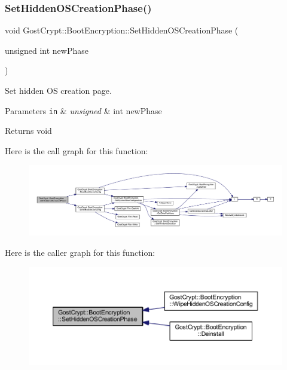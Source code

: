 \subsubsection{\texorpdfstring{Set\+Hidden\+O\+S\+Creation\+Phase()}{SetHiddenOSCreationPhase()}}
{\footnotesize\ttfamily void Gost\+Crypt\+::\+Boot\+Encryption\+::\+Set\+Hidden\+O\+S\+Creation\+Phase (\begin{DoxyParamCaption}\item[{unsigned int}]{new\+Phase }\end{DoxyParamCaption})}



Set hidden OS creation page. 


\begin{DoxyParams}[1]{Parameters}
\mbox{\tt in}  & {\em unsigned} & int new\+Phase \\
\hline
\end{DoxyParams}
\begin{DoxyReturn}{Returns}
void 
\end{DoxyReturn}
Here is the call graph for this function\+:
\nopagebreak
\begin{figure}[H]
\begin{center}
\leavevmode
\includegraphics[width=350pt]{class_gost_crypt_1_1_boot_encryption_a06e9ef71b195c22837580dc678bb1e3f_cgraph}
\end{center}
\end{figure}
Here is the caller graph for this function\+:
\nopagebreak
\begin{figure}[H]
\begin{center}
\leavevmode
\includegraphics[width=350pt]{class_gost_crypt_1_1_boot_encryption_a06e9ef71b195c22837580dc678bb1e3f_icgraph}
\end{center}
\end{figure}
\mbox{\label{class_gost_crypt_1_1_boot_encryption_ae96eefda4ed624bd336f89b4a261b2c1}} 
